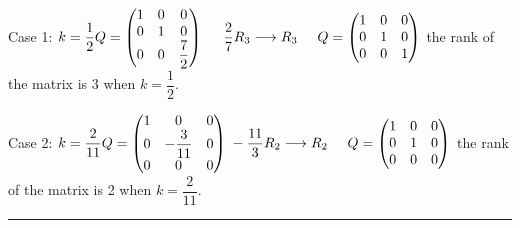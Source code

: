 \documentclass[fleqn]{article}
\begin{document}
\begin{enumerate}
      \textcolor{hwColor}{
        Case 1: 
        $
           k=\dfrac{1}{2}
           \\
           Q=\begin{pmatrix}
             1 & 0 & 0 \\
             0 & 1 & 0 \\
             0 & 0 & \dfrac{7}{2}
           \end{pmatrix}
           \hspace{0.5cm} \dfrac{2}{7}R_3 \longrightarrow R_3
           \hspace{0.5cm} Q=\begin{pmatrix}
            1 & 0 & 0 \\
            0 & 1 & 0 \\
            0 & 0 & 1
           \end{pmatrix}
        $
        the rank of the matrix is 3 when $k=\dfrac{1}{2}$.
      }

      \bigbreak

      \textcolor{hwColor}{
        Case 2: 
        $
           k=\dfrac{2}{11}
           \\
           Q=\begin{pmatrix}
             1 & 0 & 0 \\
             0 & -\dfrac{3}{11} & 0 \\
             0 & 0 & 0
           \end{pmatrix}
           \hspace{0.1cm} -\dfrac{11}{3}R_2 \longrightarrow R_2
           \hspace{0.5cm} Q=\begin{pmatrix}
            1 & 0 & 0 \\
            0 & 1 & 0 \\
            0 & 0 & 0
           \end{pmatrix}
        $
        the rank of the matrix is 2 when $k=\dfrac{2}{11}$.
      }

      \textcolor{hwColor}{
        \rule{16cm}{0.4pt}
      }

      \bigbreak


\end{enumerate}
\end{document}
